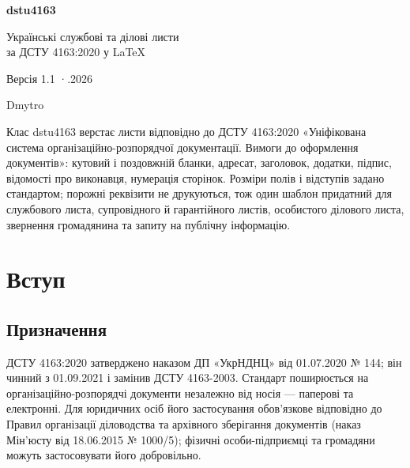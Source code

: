 \documentclass[11pt,a4paper]{article}
\newcommand\pkg[1]{\textsf{#1}}
\newcommand\cls{\pkg{dstu4163}}
\begin{document}
\begin{titlepage}
  \centering
  \vspace*{30mm}
  {\Huge\bfseries\color{accent} dstu4163\par}
  \vspace{6mm}
  {\Large Українські службові та ділові листи\\ за ДСТУ 4163:2020 у \LaTeX\par}
  \vspace{10mm}
  {\large Версія 1.1 \quad·.2026\par}
  \vspace{4mm}
  {\large Dmytro\par}
  \vfill
  \begin{minipage}{0.8\linewidth}
    \small
    Клас \cls{} верстає листи відповідно до ДСТУ 4163:2020 «Уніфікована система
    організаційно-розпорядчої документації. Вимоги до оформлення документів»:
    кутовий і поздовжній бланки, адресат, заголовок, додатки, підпис,
    відомості про виконавця, нумерація сторінок. Розміри полів і відступів
    задано стандартом; порожні реквізити не друкуються, тож один шаблон
    придатний для службового листа, супровідного й гарантійного листів,
    особистого ділового листа, звернення громадянина та запиту на публічну
    інформацію.
  \end{minipage}
  \vspace{20mm}
\end{titlepage}

\tableofcontents
\newpage

\section{Вступ}

\subsection{Призначення}

ДСТУ 4163:2020 затверджено наказом ДП «УкрНДНЦ» від 01.07.2020 № 144; він
чинний з 01.09.2021 і замінив ДСТУ 4163-2003. Стандарт поширюється на
організаційно-розпорядчі документи незалежно від носія — паперові та
електронні. Для юридичних осіб його застосування обов'язкове відповідно до
Правил організації діловодства та архівного зберігання документів (наказ
Мін'юсту від 18.06.2015 № 1000/5); фізичні особи-підприємці та громадяни
можуть застосовувати його добровільно.
\end{document}
